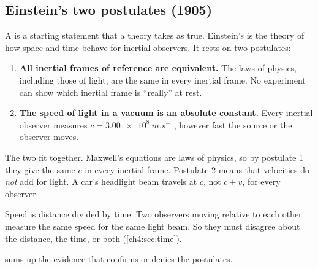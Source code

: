 \subsection{Einstein's two postulates (1905)}
A  is a starting statement that a theory takes as true. Einstein's
 is the theory of how space and time behave for inertial observers.
It rests on two postulates:
\begin{enumerate}
  \item \textbf{All inertial frames of reference are equivalent.} The laws of physics, including
        those of light, are the same in every inertial frame. No experiment can show which
        inertial frame is ``really'' at rest.
  \item \textbf{The speed of light in a vacuum is an absolute constant.} Every inertial observer
        measures $c = \qty{3.00e8}{m.s^{-1}}$, however fast the source or the observer moves.
\end{enumerate}
The two fit together. Maxwell's equations are laws of physics, so by postulate 1 they give the
same $c$ in every inertial frame. Postulate 2 means that velocities do \emph{not} add for light.
A car's headlight beam travels at $c$, not $c + v$, for every observer.

Speed is distance divided by time. Two observers moving relative to each other measure the same
speed for the same light beam. So they must disagree about the distance, the time, or both
(\cref{ch4:sec:time}).

 sums up the evidence that confirms or denies the postulates.

